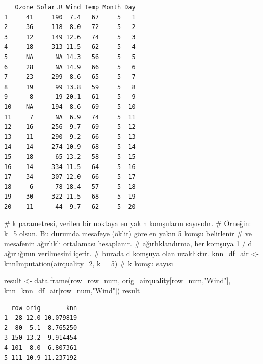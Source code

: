 \documentclass[
  letterpaper,
  DIV=11,
  numbers=noendperiod]{scrreprt}
\newenvironment{Shaded}{\begin{snugshade}}{\end{snugshade}}
\newcommand{\AttributeTok}[1]{\textcolor[rgb]{0.40,0.45,0.13}{#1}}
\newcommand{\CommentTok}[1]{\textcolor[rgb]{0.37,0.37,0.37}{#1}}
\newcommand{\DecValTok}[1]{\textcolor[rgb]{0.68,0.00,0.00}{#1}}
\newcommand{\FunctionTok}[1]{\textcolor[rgb]{0.28,0.35,0.67}{#1}}
\newcommand{\NormalTok}[1]{\textcolor[rgb]{0.00,0.23,0.31}{#1}}
\newcommand{\OtherTok}[1]{\textcolor[rgb]{0.00,0.23,0.31}{#1}}
\newcommand{\SpecialCharTok}[1]{\textcolor[rgb]{0.37,0.37,0.37}{#1}}
\newcommand{\StringTok}[1]{\textcolor[rgb]{0.13,0.47,0.30}{#1}}
\begin{document}
\begin{verbatim}
   Ozone Solar.R Wind Temp Month Day
1     41     190  7.4   67     5   1
2     36     118  8.0   72     5   2
3     12     149 12.6   74     5   3
4     18     313 11.5   62     5   4
5     NA      NA 14.3   56     5   5
6     28      NA 14.9   66     5   6
7     23     299  8.6   65     5   7
8     19      99 13.8   59     5   8
9      8      19 20.1   61     5   9
10    NA     194  8.6   69     5  10
11     7      NA  6.9   74     5  11
12    16     256  9.7   69     5  12
13    11     290  9.2   66     5  13
14    14     274 10.9   68     5  14
15    18      65 13.2   58     5  15
16    14     334 11.5   64     5  16
17    34     307 12.0   66     5  17
18     6      78 18.4   57     5  18
19    30     322 11.5   68     5  19
20    11      44  9.7   62     5  20
\end{verbatim}

\begin{Shaded}
\begin{Highlighting}[]
\CommentTok{\# k parametresi, verilen bir noktaya en yakın komşuların sayısıdır. }
\CommentTok{\# Örneğin: k=5 olsun. Bu durumda mesafeye (öklit) göre en yakın 5 komşu belirlenir}
\CommentTok{\# ve mesafenin ağırlıklı ortalaması hesaplanır.}
\CommentTok{\# ağırlıklandırma, her komşuya 1 / d ağırlığının verilmesini içerir.}
\CommentTok{\# burada d komşuya olan uzaklıktır.}
\NormalTok{knn\_df\_air }\OtherTok{\textless{}{-}} \FunctionTok{knnImputation}\NormalTok{(airquality\_2, }\AttributeTok{k =} \DecValTok{5}\NormalTok{) }\CommentTok{\# k komşu sayısı}

\NormalTok{result }\OtherTok{\textless{}{-}} \FunctionTok{data.frame}\NormalTok{(}\AttributeTok{row=}\NormalTok{row\_num,}
                     \AttributeTok{orig=}\NormalTok{airquality[row\_num,}\StringTok{"Wind"}\NormalTok{],}
                     \AttributeTok{knn=}\NormalTok{knn\_df\_air[row\_num,}\StringTok{"Wind"}\NormalTok{])}
\NormalTok{result}
\end{Highlighting}
\end{Shaded}

\begin{verbatim}
  row orig       knn
1  28 12.0 10.079819
2  80  5.1  8.765250
3 150 13.2  9.914454
4 101  8.0  6.807361
5 111 10.9 11.237192
\end{verbatim}

\begin{Shaded}
\end{Shaded}
\end{document}
